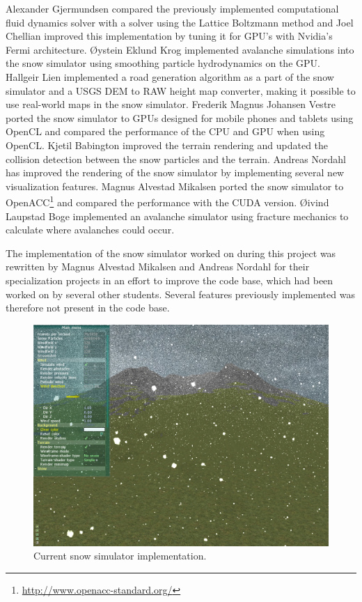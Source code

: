 Alexander Gjermundsen\cite{lbmWind} compared the previously implemented
computational fluid dynamics solver with a solver using the Lattice Boltzmann
method and Joel Chellian\cite{fermi} improved this implementation by tuning it
for GPU's with Nvidia's Fermi architecture. Øystein Eklund Krog\cite{avalanche1}
implemented avalanche simulations into the snow simulator using smoothing
particle hydrodynamics on the GPU. Hallgeir Lien\cite{road} implemented a road
generation algorithm as a part of the snow simulator and a USGS DEM to RAW
height map converter, making it possible to use real-world maps in the snow
simulator. Frederik Magnus Johansen Vestre\cite{openclSnowThesis} ported the
snow simulator to GPUs designed for mobile phones and tablets using OpenCL and
compared the performance of the CPU and GPU when using OpenCL. Kjetil
Babington\cite{snowTerrainThesis} improved the terrain rendering and updated the
collision detection between the snow particles and the terrain. Andreas
Nordahl\cite{realisticSnowTerrainThesis} has improved the rendering of the snow
simulator by implementing several new visualization features. Magnus Alvestad
Mikalsen\cite{openAccThesis} ported the snow simulator to OpenACC\footnote{\url{http://www.openacc-standard.org/}} and compared
the performance with the CUDA version. Øivind Laupstad Boge\cite{avalanche2}
implemented an avalanche simulator using fracture mechanics to calculate where
avalanches could occur.

The implementation of the snow simulator worked on during this project was rewritten 
by Magnus Alvestad Mikalsen and Andreas Nordahl for their specialization projects 
in an effort to improve the code base, which had been worked on by several other 
students. Several features previously implemented was therefore not present in 
the code base\cite{openAccThesis, realisticSnowTerrainThesis}. 

\begin{figure}[ht]
	\center
	\includegraphics[width=1.0\textwidth]{images/snow/gpu/snow7}
	\caption{Current snow simulator implementation.}
	\label{fig:gpuSnow}
\end{figure}

